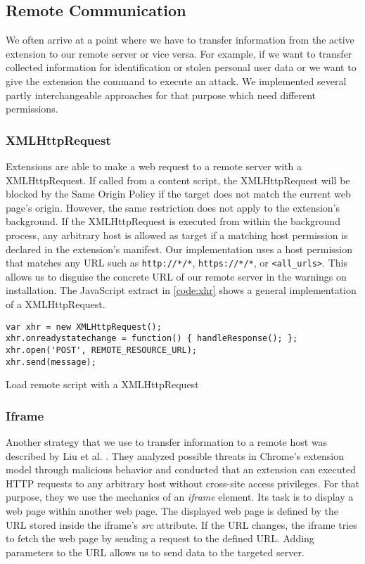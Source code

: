 \subsection{Remote Communication}

	We often arrive at a point where we have to transfer information from the active extension to our remote server or vice versa. For example, if we want to transfer collected information for identification or stolen personal user data or we want to give the extension the command to execute an attack. We implemented several partly interchangeable approaches for that purpose which need different permissions. 

\subsubsection{XMLHttpRequest}
\label{sec:xhrCommunication}

	Extensions are able to make a web request to a remote server with a XMLHttpRequest. If called from a content script, the XMLHttpRequest will be blocked by the Same Origin Policy if the target does not match the current web page's origin. However, the same restriction does not apply to the extension's background. If the XMLHttpRequest is executed from within the background process, any arbitrary host is allowed as target if a matching host permission is declared in the extension's manifest. Our implementation uses a host permission that matches any URL such as \texttt{http://*/*}, \texttt{https://*/*}, or \texttt{<all\_urls>}. This allows us to disguise the concrete URL of our remote server in the warnings on installation. The JavaScript extract in \autoref{code:xhr} shows a general implementation of a XMLHttpRequest. 
	
	\begin{code}
		\begin{lstlisting}
var xhr = new XMLHttpRequest();
xhr.onreadystatechange = function() { handleResponse(); };
xhr.open('POST', REMOTE_RESOURCE_URL);
xhr.send(message);
		\end{lstlisting}
		\caption{Load remote script with a XMLHttpRequest}
		\label{code:xhr}
	\end{code}

\subsubsection{Iframe}

	Another strategy that we use to transfer information to a remote host was described by Liu et al. \cite{Liu12chromeextensions:}. They analyzed possible threats in Chrome's extension model through malicious behavior and conducted that an extension can executed HTTP requests to any arbitrary host without cross-site access privileges. For that purpose, they we use the mechanics of an \textit{iframe} element. Its task is to display a web page within another web page. The displayed web page is defined by the URL stored inside the iframe's \textit{src} attribute. If the URL changes, the iframe tries to fetch the web page by sending a request to the defined URL. Adding parameters to the URL allows us to send data to the targeted server. 

